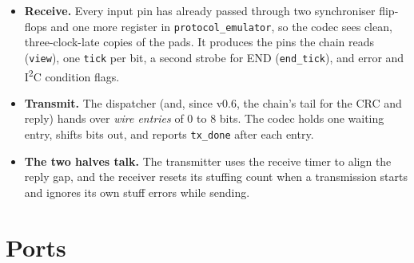 \documentclass[11pt,a4paper]{article}
\newcommand{\sig}[1]{\texttt{#1}}
\begin{document}
\begin{itemize}
\item \textbf{Receive.} Every input pin has already passed through two synchroniser flip-flops and one more register in \sig{protocol\_emulator}, so the codec sees clean, three-clock-late copies of the pads. It produces the pins the chain reads (\sig{view}), one \sig{tick} per bit, a second strobe for END (\sig{end\_tick}), and error and I\textsuperscript{2}C condition flags.
\item \textbf{Transmit.} The dispatcher (and, since v0.6, the chain's tail for the CRC and reply) hands over \emph{wire entries} of 0 to 8 bits. The codec holds one waiting entry, shifts bits out, and reports \sig{tx\_done} after each entry.
\item \textbf{The two halves talk.} The transmitter uses the receive timer to align the reply gap, and the receiver resets its stuffing count when a transmission starts and ignores its own stuff errors while sending.
\end{itemize}

\section{Ports}
\end{document}
